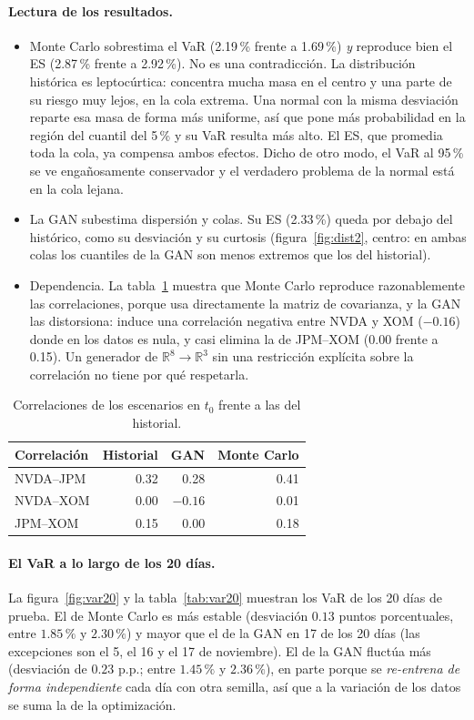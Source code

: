 \documentclass[12pt,letterpaper]{article}
\newcommand{\R}{\mathbb{R}}
\begin{document}
\paragraph{Lectura de los resultados.}
\begin{itemize}[nosep]
  \item Monte Carlo sobrestima el VaR (2.19\,\% frente a 1.69\,\%) \emph{y} reproduce bien el ES (2.87\,\% frente a 2.92\,\%). No es una contradicción. La distribución histórica es leptocúrtica: concentra mucha masa en el centro y una parte de su riesgo muy lejos, en la cola extrema. Una normal con la misma desviación reparte esa masa de forma más uniforme, así que pone más probabilidad en la región del cuantil del 5\,\% y su VaR resulta más alto. El ES, que promedia toda la cola, ya compensa ambos efectos. Dicho de otro modo, el VaR al 95\,\% se ve engañosamente conservador y el verdadero problema de la normal está en la cola lejana.
  \item La GAN subestima dispersión y colas. Su ES (2.33\,\%) queda por debajo del histórico, como su desviación y su curtosis (figura~\ref{fig:dist2}, centro: en ambas colas los cuantiles de la GAN son menos extremos que los del historial).
  \item Dependencia. La tabla~\ref{tab:corr} muestra que Monte Carlo reproduce razonablemente las correlaciones, porque usa directamente la matriz de covarianza, y la GAN las distorsiona: induce una correlación negativa entre NVDA y XOM ($-0.16$) donde en los datos es nula, y casi elimina la de JPM--XOM (0.00 frente a 0.15). Un generador de $\R^8\to\R^3$ sin una restricción explícita sobre la correlación no tiene por qué respetarla.
\end{itemize}

\begin{table}[H]
\centering
\renewcommand{\arraystretch}{1.2}
\begin{tabular}{@{}lrrr@{}}
\toprule
\textbf{Correlación} & \textbf{Historial} & \textbf{GAN} & \textbf{Monte Carlo}\\
\midrule
NVDA--JPM & 0.32 & 0.28 & 0.41\\
NVDA--XOM & 0.00 & $-0.16$ & 0.01\\
JPM--XOM & 0.15 & 0.00 & 0.18\\
\bottomrule
\end{tabular}
\caption{Correlaciones de los escenarios en $t_0$ frente a las del historial.}\label{tab:corr}
\end{table}

\paragraph{El VaR a lo largo de los 20 días.}
La figura~\ref{fig:var20} y la tabla~\ref{tab:var20} muestran los VaR de los 20 días de prueba. El de Monte Carlo es más estable (desviación $0.13$ puntos porcentuales, entre $1.85\,\%$ y $2.30\,\%$) y mayor que el de la GAN en 17 de los 20 días (las excepciones son el 5, el 16 y el 17 de noviembre). El de la GAN fluctúa más (desviación de $0.23$ p.p.; entre $1.45\,\%$ y $2.36\,\%$), en parte porque se \emph{re-entrena de forma independiente} cada día con otra semilla, así que a la variación de los datos se suma la de la optimización.
\end{document}
